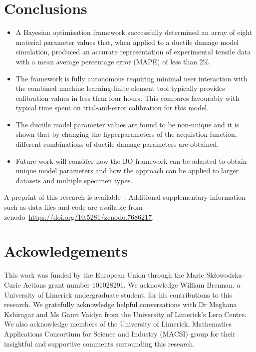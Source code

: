 \documentclass[preprint, review, 12pt]{elsarticle}
\begin{document}
	\section{Conclusions}
	\label{h:conclusions}

	\begin{itemize}
		\item A Bayesian optimisation framework successfully determined an array of eight material parameter values that, when applied to a ductile damage model simulation, produced an accurate representation of experimental tensile data with a mean average percentage error (MAPE) of less than 2\%.
		\item The framework is fully autonomous requiring minimal user interaction with the combined machine learning-finite element tool typically provides calibration values in less than four hours.
		This compares favourably with typical time spent on trial-and-error calibration for this model.
		\item The ductile model parameter values are found to be non-unique and it is shown that by changing the hyperparameters of the acquistion function, different combinations of ductile damage parameters are obtained.
		\item Future work will consider how the BO framework can be adapted to obtain unique model parameters and how the approach can be applied to larger datasets and multiple specimen types.
	\end{itemize}

	A preprint of this research is available~\cite{OCONNOR2023}.
	Additional supplementary information such as data files and code are available from zenodo~\url{https://doi.org/10.5281/zenodo.7686217}.

	\section{Ackowledgements}
	\label{h:acknowledgements}

	This work was funded by the European Union through the Marie Sk{\l}owodska-Curie Actions grant number 101028291.
	We acknowledge William Brennan, a University of Limerick undergraduate student, for his contributions to this research.
	We gratefully acknowledge helpful conversations with Dr Meghana Kshiragar and Ms Gauri Vaidya from the University of Limerick's Lero Centre.
	We also acknowledge members of the University of Limerick, Mathematics Applications Consortium for Science and Industry (MACSI) group for their insightful and supportive comments surrounding this research.

%


\end{document}
